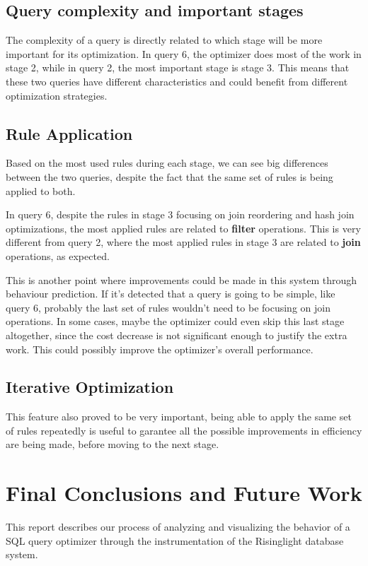 \documentclass[a4paper,12pt]{scrreprt}
\begin{document}
\section{Query complexity and important stages}
The complexity of a query is directly related to which stage will be more important for its optimization.
In query 6, the optimizer does most of the work in stage 2, while in query 2, the most important stage is stage 3. This means that these two queries have different characteristics and could benefit from different optimization strategies.

\section{Rule Application}   

Based on the most used rules during each stage, we can see big differences between the two queries, despite the fact that the same set of rules is being applied to both.

In query 6, despite the rules in stage 3 focusing on join reordering and hash join optimizations, the most applied rules are related to \textbf{filter} operations.
This is very different from query 2, where the most applied rules in stage 3 are related to \textbf{join} operations, as expected.

This is another point where improvements could be made in this system through behaviour prediction. If it's detected that a query is going to be simple, like query 6, probably the last set of rules wouldn't need to be focusing on join operations. In some cases, maybe the optimizer could even skip this last stage altogether, since the cost decrease is not significant enough to justify the extra work. This could possibly improve the optimizer's overall performance.

\section{Iterative Optimization}
This feature also proved to be very important, being able to apply the same set of rules repeatedly is useful to garantee all the possible improvements in efficiency are being made, before moving to the next stage. \\

\chapter{Final Conclusions and Future Work} \label{chap:concl}
\thispagestyle{fancy}
This report describes our process of analyzing and visualizing the behavior of a SQL query optimizer through the instrumentation of the Risinglight database system.
\end{document}
